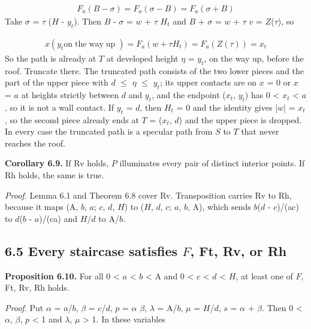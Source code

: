 \documentclass[11pt]{article}
\newcommand{\Beta}{B}
\begin{document}
\begin{gather*}
F_{a}(\Beta - \sigma) = F_{a}(\sigma - \Beta) = F_{a}(\sigma + \Beta)
\end{gather*}
Take \(\sigma\) = \(\tau\) (\(H\) - \(y_{t}\)). Then \(\Beta\) - \(\sigma\) = \(w\) + \(\tau\) \(H_{t}\) and \(\Beta\) + \(\sigma\) = \(w\) + \(\tau\) \(v\) = \(Z\)(\(\tau\)), so

\begin{gather*}
x(y_{t} \text{on}\; \text{the}\; \text{way}\; \text{up}\;) = F_{a}(w + \tau H_{t}) = F_{a}(Z(\tau)) = x_{t}
\end{gather*}
So the path is already at \(T\) at developed height \(\eta\) = \(y_{t}\), on the way up, before the roof. Truncate there. The truncated path consists of the two lower pieces and the part of the upper piece with \(d\) \(\le\) \(\eta\) \(\le\) \(y_{t}\); its upper contacts are on \(x\) = 0 or \(x\) = \(a\) at heights strictly between \(d\) and \(y_{t}\), and the endpoint (\(x_{t}\), \(y_{t}\)) has 0 < \(x_{t}\) < \(a\), so it is not a wall contact. If \(y_{t}\) = \(d\), then \(H_{t}\) = 0 and the identity gives |\(w\)| = \(x_{t}\), so the second piece already ends at \(T\) = (\(x_{t}\), \(d\)) and the upper piece is dropped. In every case the truncated path is a specular path from \(S\) to \(T\) that never reaches the roof.

\textbf{Corollary 6.9.} If Rv holds, \(P\) illuminates every pair of distinct interior points. If Rh holds, the same is true.

\emph{Proof.} Lemma 6.1 and Theorem 6.8 cover Rv. Transposition carries Rv to Rh, because it maps (A, \(b\), \(a\); \(c\), \(d\), \(H\)) to (\(H\), \(d\), \(c\); \(a\), \(b\), A), which sends \(b\)(\(d\) - \(c\))/(ac) to \(d\)(\(b\) - \(a\))/(ca) and \(H\)/\(d\) to A/\(b\).

\subsection*{6.5 Every staircase satisfies \(F\), Ft, Rv, or Rh}
\textbf{Proposition 6.10.} For all 0 < \(a\) < \(b\) < A and 0 < \(c\) < \(d\) < \(H\), at least one of \(F\), Ft, Rv, Rh holds.

\emph{Proof.} Put \(\alpha\) = \(a\)/\(b\), \(\beta\) = \(c\)/\(d\), \(p\) = \(\alpha\) \(\beta\), \(\lambda\) = A/\(b\), \(\mu\) = \(H\)/\(d\), \(s\) = \(\alpha\) + \(\beta\). Then 0 < \(\alpha\), \(\beta\), \(p\) < 1 and \(\lambda\), \(\mu\) > 1. In these variables
\end{document}
